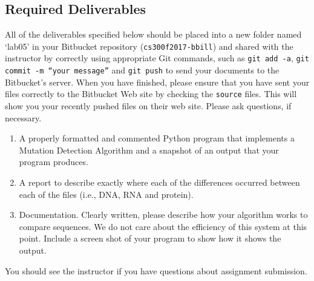 \vspace*{-.1in}
\subsection*{Required Deliverables}
\vspace*{-.1in}
All of the deliverables specified below should be placed into a new folder named `lab05' in your Bitbucket repository ({\tt cs300f2017-bbill})  and shared with the instructor by correctly using  appropriate Git commands, such as {\tt git add -a}, {\tt git commit -m ``your message''} and {\tt git push} to send your documents to the Bitbucket's server. When you have finished, please ensure that you have sent your files correctly to the Bitbucket Web site by checking the {\tt source} files. This will show you your recently pushed files on their web site. Please ask questions, if necessary.
\color{red}
\begin{enumerate}
	\item A properly formatted and commented Python program that implements a Mutation Detection Algorithm and a snapshot of an output that your program produces.
	\item A report to describe exactly where each of the differences occurred between each of the files (i.e., DNA, RNA and protein). 
	\item Documentation. Clearly written, please describe how your algorithm works to compare sequences. We do not care about the efficiency of this system at this point. Include a screen shot of your program to show how it shows the output.
\end{enumerate}
\color{black}

\noindent You should see the instructor if you have questions about assignment submission.




